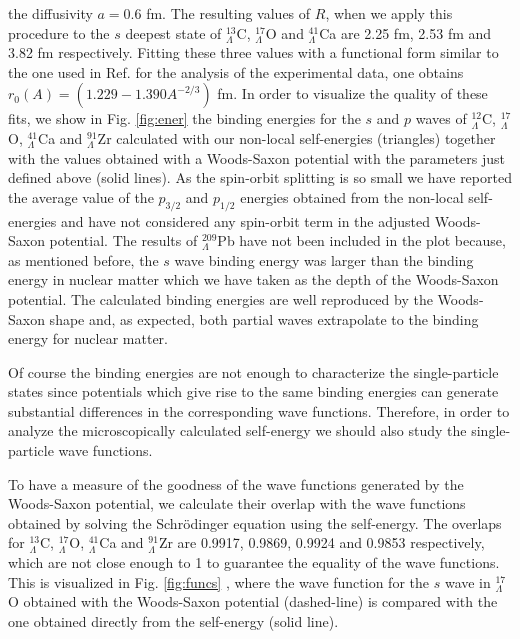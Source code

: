 the diffusivity $a=0.6$ fm. The resulting values of $R$, when we apply this
procedure to the $s$ deepest state of $^{13}_{\Lambda}$C,
$^{17}_{\Lambda}$O and $^{41}_{\Lambda}$Ca are 2.25 fm, 2.53 fm and
3.82 fm respectively. Fitting these three values with a functional form similar
to the one used in Ref. \cite{mille88} for the analysis of the 
experimental data,
one obtains $r_0(A)=(1.229 - 1.390 A^{-2/3})$ fm. In order to visualize the quality
of these fits, we show in Fig. \ref{fig:ener} the binding energies for the
$s$ and $p$ waves of $^{12}_{\Lambda}$C, $^{17}_{\Lambda}$O, $^{41}_{\Lambda}$Ca and
$^{91}_{\Lambda}$Zr calculated with our non-local self-energies
(triangles) together 
with the values obtained with a Woods-Saxon potential with 
the parameters just defined above (solid lines). 
As the spin-orbit splitting is so small we 
have reported the average value of the $p_{3/2}$ and $p_{1/2}$ 
energies obtained from the non-local
self-energies and have
not considered any spin-orbit term in the  adjusted Woods-Saxon potential.   
The results of $^{209}_{\Lambda}$Pb have not been included in the plot because,
as mentioned before, the $s$ wave binding energy was larger than the
binding energy in nuclear matter which we have taken as the depth of the 
Woods-Saxon potential. 
The calculated binding energies are well reproduced by the Woods-Saxon shape
and, as expected, both partial waves extrapolate to the binding
energy for nuclear matter.


Of course the binding energies are not enough to characterize the
single-particle states since potentials which give rise to the same binding
energies can generate substantial differences in the corresponding
wave functions. Therefore, in order to analyze the microscopically
calculated self-energy we should also study the single-particle wave
functions.



 To have a measure of the goodness of the wave
functions generated by the Woods-Saxon potential,  we calculate their 
overlap with the wave functions obtained by solving the
Schr\"odinger equation using the self-energy. The overlaps for
$^{13}_{\Lambda}$C, 
$^{17}_{\Lambda}$O, $^{41}_{\Lambda}$Ca and $^{91}_{\Lambda}$Zr are  0.9917,
0.9869, 0.9924 and 0.9853 respectively, which 
 are not close enough to 1 to guarantee
the equality of the wave functions. 
This is visualized in Fig. \ref{fig:funcs} , where the wave
function
for the $s$ wave in $^{17}_{\Lambda}$O obtained with the Woods-Saxon potential
(dashed-line) is compared with the one obtained directly from the
self-energy (solid line).

